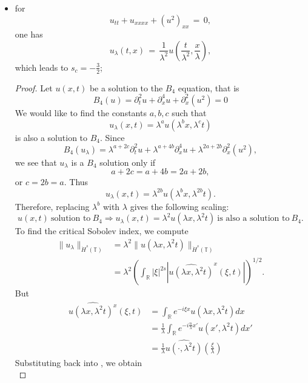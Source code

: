 \documentclass[12pt,reqno]{amsart}
\numberwithin{equation}{section}  %
\renewcommand{\cref}{\Cref}
\newcommand{\rr}{\mathbb{R}}
\newcommand{\ci}{\mathbb{T}}
\newcommand{\wh}{\widehat}
\begin{document}
\begin{appendices}
\begin{itemize}
  \item for 
    \[
    u_{tt}+u_{xxxx}+(u^2)_{xx}\,=\,0,
    \]
    one has 
    \[
    u_{\lambda}(t,x)\,=\,\frac{1}{\lambda^2}u\left(\frac{t}{\lambda^2}, \frac{x}{\lambda}\right),
    \]
    which leads to $s_c=-\frac 32$;
\begin{proof}
Let $u(x, t)$ be a solution to the $B_4$ equation, that is
%
$$
B_4(u)=
 \partial_t^2u + \partial^4_x u + \partial_x^2(u^2)  = 0
$$
%
We would like to find the constants
$a, b, c$ such that
\[
u_\lambda (x, t) = \lambda^a u(\lambda^b x, \lambda^c t)
\]
is also a solution to $B_4$.  Since 
$$
B_4(u_\lambda)=
\lambda^{a+2c} \partial_t^2u 
+
 \lambda^{a+4b} \partial^4_x u 
 +
  \lambda^{2a+2b}
  \partial_x^2(u^2),  
$$
we see that $u_\lambda$ is a $B_4$ solution only if
$$
a+2c=a+4b=2a+2b,
$$
or
$
c= 2b =a.
$
  Thus
\[
u_\lambda (x, t) = \lambda^{2b} u(\lambda^{b}x,  \lambda^{2b} t).
\]
%
%
Therefore, replacing  $\lambda^b$ with  $ \lambda$ gives the following scaling:
%
\begin{equation}
\label{DP-scal}
\boxed{u(x, t) \ \text{solution to} \  B_4
 \Longrightarrow 
u_\lambda (x, t) = \lambda^2 u(\lambda x, \lambda^2 t)  \ \text{is also a
solution to} \  B_4.}
\end{equation}
\label{rem:scaling}
To find the critical Sobolev index, we compute
%
%
\begin{equation}
\begin{split}
  \| u_{\lambda} \|_{\dot{H}^s(\ci)} 
  & = \lambda^{2} \| u(\lambda x, \lambda^2 t) \|_{\dot{H}^{s}(\ci)}
  \\
  & = \lambda^{2} \left( \int_{\rr} | \xi |^{2s} | \wh{u (\lambda x,
  \lambda^{2} t)}^x (\xi, t)| \right)^{1/2}.
\end{split}
\label{crit-ind-comp}
\end{equation}
%
But
%
%
\begin{equation*}
\begin{split}
  \wh{u(\lambda x, \lambda^{2}t)^x}(\xi, t)
  & = \int_{\rr}e^{-i\xi x}u(\lambda x, \lambda^2 t) dx
  \\
  & = \frac{1}{\lambda} \int_{\rr}e^{-i \frac{n}{\lambda} x'}u(x',
  \lambda^{2} t) dx'
  \\
  & = \frac{1}{\lambda} \wh{u(\cdot, \lambda^{2}t)}(\frac{\xi}{\lambda})
\end{split}
\end{equation*}
%
%
Substituting back into \cref{crit-ind-comp}, we obtain
%
%
\begin{equation*}

\end{equation*}
\end{proof}
\end{itemize}
\end{appendices}
\end{document}
